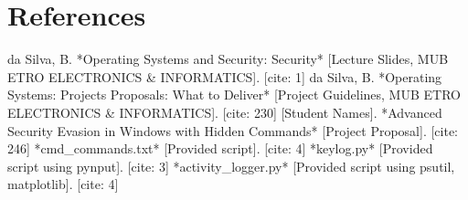 \documentclass[11pt]{article}
\begin{document}
	\section*{References} %
	\begin{thebibliography}{99} %
		
		 da Silva, B. *Operating Systems and Security: Security* [Lecture Slides, MUB ETRO ELECTRONICS & INFORMATICS]. [cite: 1]
		 da Silva, B. *Operating Systems: Projects Proposals: What to Deliver* [Project Guidelines, MUB ETRO ELECTRONICS & INFORMATICS]. [cite: 230]
		 [Student Names]. *Advanced Security Evasion in Windows with Hidden Commands* [Project Proposal]. [cite: 246]
		 *cmd\_commands.txt* [Provided script]. [cite: 4]
		 *keylog.py* [Provided script using pynput]. [cite: 3]
		 *activity_logger.py* [Provided script using psutil, matplotlib]. [cite: 4] %
		

\end{thebibliography}
\end{document}
